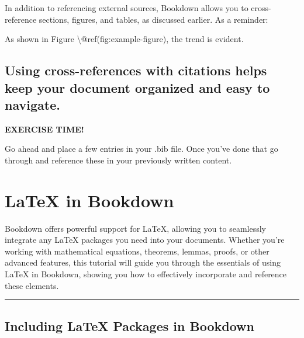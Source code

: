 \documentclass[
]{book}
\newenvironment{Shaded}{\begin{snugshade}}{\end{snugshade}}
\newcommand{\NormalTok}[1]{#1}
\newenvironment{blackbox}{
  \definecolor{shadecolor}{rgb}{0, 0, 0}  %
  \color{white}
  \begin{shaded}}
 {\end{shaded}}
\theoremstyle{definition}
\theoremstyle{definition}
\theoremstyle{definition}
\theoremstyle{definition}
\theoremstyle{remark}
\begin{document}
In addition to referencing external sources, Bookdown allows you to cross-reference sections, figures, and tables, as discussed earlier. As a reminder:

\begin{Shaded}
\begin{Highlighting}[]
\NormalTok{As shown in Figure \textbackslash{}@ref(fig:example{-}figure), the trend is evident.}
\end{Highlighting}
\end{Shaded}

\section{Using cross-references with citations helps keep your document organized and easy to navigate.}\label{using-cross-references-with-citations-helps-keep-your-document-organized-and-easy-to-navigate.}

\begin{blackbox}

\begin{center}
\textbf{EXERCISE TIME!}

\end{center}

Go ahead and place a few entries in your .bib file. Once you've done that go through and reference these in your previously written content.

\end{blackbox}

\chapter{LaTeX in Bookdown}\label{chapter5}

Bookdown offers powerful support for LaTeX, allowing you to seamlessly integrate any LaTeX packages you need into your documents. Whether you're working with mathematical equations, theorems, lemmas, proofs, or other advanced features, this tutorial will guide you through the essentials of using LaTeX in Bookdown, showing you how to effectively incorporate and reference these elements.

\begin{center}\rule{0.5\linewidth}{0.5pt}\end{center}

\section{Including LaTeX Packages in Bookdown}\label{including-latex-packages-in-bookdown}
\end{document}
